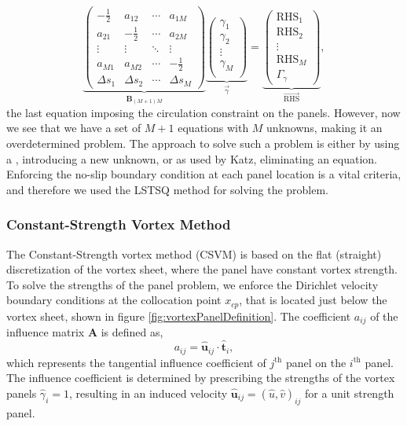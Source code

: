 	\begin{equation}
	\underbrace{\begin{pmatrix}
	-\frac{1}{2} & a_{12} & \cdots & a_{1M}\\ 
	a_{21} & -\frac{1}{2} & \cdots & a_{2M}\\
	\vdots & \vdots & \ddots & \vdots\\ 
	a_{M1} & a_{M2} & \cdots & -\frac{1}{2}\\
	\Delta s_1 & \Delta s_2 & \cdots & \Delta s_M
	\end{pmatrix}}_{\mathbf{B}_{\left(M+1\right)M}} \underbrace{\begin{pmatrix}
	\gamma_{1}\\ \gamma_{2}\\
	\vdots\\
	\gamma_M\\
	\end{pmatrix}}_{\vec{\gamma}} = \underbrace{\begin{pmatrix}
	\mathrm{RHS}_1\\ 
	\mathrm{RHS}_2\\ 
	\vdots\\
	\mathrm{RHS}_M\\
	\Gamma_{\gamma}
	\end{pmatrix}}_{\overrightarrow{\mathrm{RHS}}},
	\end{equation}
the last equation imposing the circulation constraint on the panels. However, now we see that we have a set of $M+1$ equations with $M$ unknowns, making it an overdetermined problem. The approach to solve such a problem is either by using a , introducing a new unknown, or as used by Katz, eliminating an equation. Enforcing the no-slip boundary condition at each panel location is a vital criteria, and therefore we used the LSTSQ method for solving the problem.

\subsubsection{Constant-Strength Vortex Method}

The Constant-Strength vortex method ({\color{darkblue}CSVM}) is based on the flat (straight) discretization of the vortex sheet, where the panel have constant vortex strength. To solve the strengths of the panel problem, we enforce the Dirichlet velocity boundary conditions at the collocation point $x_{cp}$, that is located just below the vortex sheet, shown in figure \ref{fig:vortexPanelDefinition}. The coefficient $a_{ij}$ of the influence matrix $\mathbf{A}$ is defined as,
	\begin{equation}
	a_{ij} = \mathbf{\hat{u}}_{ij} \cdot \mathbf{\hat{t}}_i,
	\end{equation}
which represents the tangential influence coefficient of $j^{\mathrm{th}}$ panel on the $i^{\textrm{th}}$ panel. The influence coefficient is determined by prescribing the strengths of the vortex panels $\hat{\gamma}_i = 1$, resulting in an induced velocity $\mathbf{\hat{u}}_{ij} = \left(\hat{u},\hat{v}\right)_{ij}$ for a unit strength panel.

